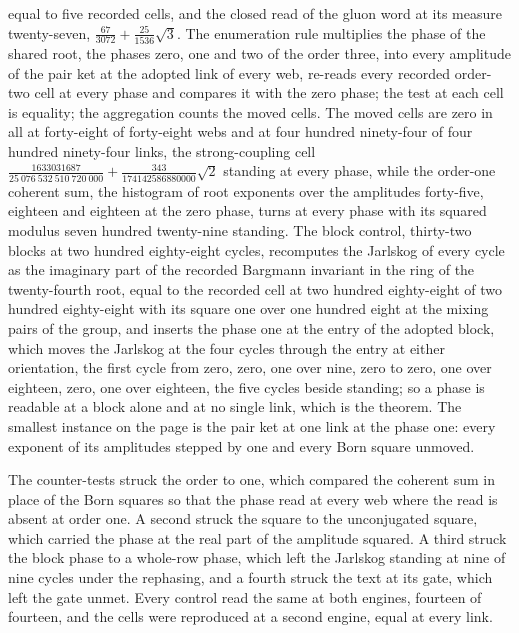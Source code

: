 \begin{chproof}[finite]
equal to five recorded cells, and the closed read of the gluon word at its measure twenty-seven, $\tfrac{67}{3072} + \tfrac{25}{1536}\sqrt{3}$. The enumeration rule multiplies the phase of the shared root, the phases zero, one and two of the order three, into every amplitude of the pair ket at the adopted link of every web, re-reads every recorded order-two cell at every phase and compares it with the zero phase; the test at each cell is equality; the aggregation counts the moved cells. The moved cells are zero in all at forty-eight of forty-eight webs and at four hundred ninety-four of four hundred ninety-four links, the strong-coupling cell $\tfrac{1633031687}{25\ 076\ 532\ 510\ 720\ 000} + \tfrac{343}{174142586880000}\sqrt{2}$ standing at every phase, while the order-one coherent sum, the histogram of root exponents over the amplitudes forty-five, eighteen and eighteen at the zero phase, turns at every phase with its squared modulus seven hundred twenty-nine standing. The block control, thirty-two blocks at two hundred eighty-eight cycles, recomputes the Jarlskog of every cycle as the imaginary part of the recorded Bargmann invariant in the ring of the twenty-fourth root, equal to the recorded cell at two hundred eighty-eight of two hundred eighty-eight with its square one over one hundred eight at the mixing pairs of the group, and inserts the phase one at the entry of the adopted block, which moves the Jarlskog at the four cycles through the entry at either orientation, the first cycle from zero, zero, one over nine, zero to zero, one over eighteen, zero, one over eighteen, the five cycles beside standing; so a phase is readable at a block alone and at no single link, which is the theorem. The smallest instance on the page is the pair ket at one link at the phase one: every exponent of its amplitudes stepped by one and every Born square unmoved.

The counter-tests struck the order to one, which compared the coherent sum in place of the Born squares so that the phase read at every web where the read is absent at order one. A second struck the square to the unconjugated square, which carried the phase at the real part of the amplitude squared. A third struck the block phase to a whole-row phase, which left the Jarlskog standing at nine of nine cycles under the rephasing, and a fourth struck the text at its gate, which left the gate unmet. Every control read the same at both engines, fourteen of fourteen, and the cells were reproduced at a second engine, equal at every link.
\end{chproof}
\par\medskip{}\label{narr:close:1-3}\par

